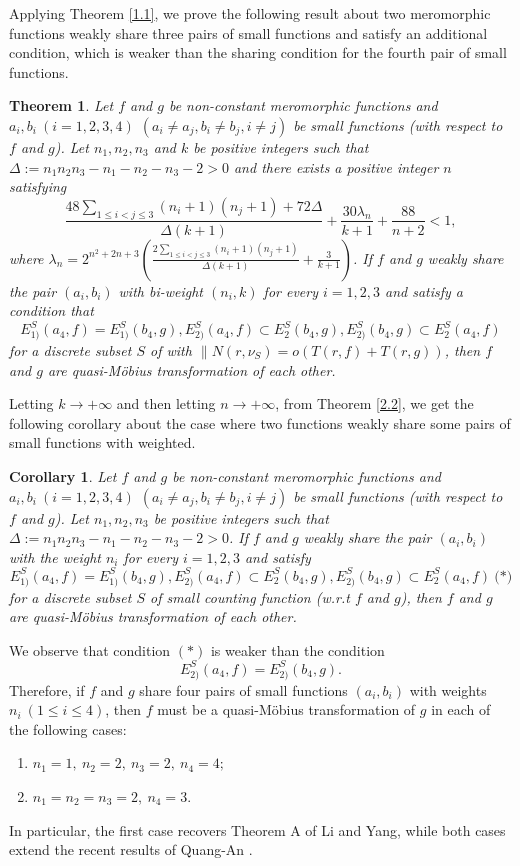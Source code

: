 \documentclass[12pt,leqno]{amsart}
\newtheorem{corollary}[equation]{Corollary}
\newtheorem{theorem}[equation]{Theorem}
\numberwithin{equation}{section}
\begin{document}
Applying Theorem \ref{1.1}, we prove the following result about two meromorphic functions weakly share three pairs of small functions and satisfy an additional condition, which is weaker than the sharing condition for the fourth pair of small functions.
\begin{theorem}\label{1.2}
Let $f$ and $g$ be non-constant meromorphic functions and $a_i,b_i\ (i=1,2,3,4)$ $ (a_i\ne a_j, b_i\ne b_j, i\ne j)$ be small functions (with respect to $f$ and $g$).  Let $n_1,n_2,n_3$ and $k$ be positive integers such that $\Delta:=n_1n_2n_3-n_1-n_2-n_3-2>0$ and there exists a positive integer $n$ satisfying
$$\frac{48\sum_{1\le i<j\le 3}(n_i+1)(n_j+1)+72\Delta}{\Delta(k+1)}+\frac{30\lambda_n}{k+1}+\frac{88}{n+2}<1,$$
where $\lambda_n=2^{n^2+2n+3}\left(\frac{2\sum_{1\le i<j\le 3}(n_i+1)(n_j+1)}{\Delta(k+1)}+\frac{3}{k+1}\right)$.
If $f$ and $g$ weakly share the pair $(a_i,b_i)$ with bi-weight $(n_i,k)$ for every $i=1,2,3$ and satisfy a condition that
$$E^S_{1)}(a_4,f)=E^S_{1)}(b_4,g),E^S_{2)}(a_4,f)\subset E^S_{2}(b_4,g),E^S_{2)}(b_4,g)\subset E^S_{2}(a_4,f)$$
for a discrete subset $S$ of with $\| N(r,\nu_S)=o(T(r,f)+T(r,g))$, then $f$ and $g$ are quasi-M\"{o}bius transformation of each other.
\end{theorem}

Letting $k\longrightarrow +\infty$ and then letting $n\longrightarrow +\infty$, from Theorem \ref{2.2}, we get the following corollary about the case where two functions weakly share some pairs of small functions with weighted.
\begin{corollary}\label{1.3}
Let $f$ and $g$ be non-constant meromorphic functions and $a_i,b_i\ (i=1,2,3,4)$ $ (a_i\ne a_j, b_i\ne b_j, i\ne j)$ be small functions (with respect to $f$ and $g$).  Let $n_1,n_2,n_3$ be positive integers such that $\Delta:=n_1n_2n_3-n_1-n_2-n_3-2>0$.
If $f$ and $g$ weakly share the pair $(a_i,b_i)$ with the weight $n_i$ for every $i=1,2,3$ and satisfy
$$E^S_{1)}(a_4,f)=E^S_{1)}(b_4,g),E^S_{2)}(a_4,f)\subset E^S_{2}(b_4,g),E^S_{2)}(b_4,g)\subset E^S_{2}(a_4,f)\ \text{(*)}$$
for a discrete subset $S$ of small counting function (w.r.t $f$ and $g$), then $f$ and $g$ are quasi-M\"{o}bius transformation of each other.
\end{corollary}
We observe that condition $(*)$ is weaker than the condition
$$E^S_{2)}(a_4,f)=E^S_{2)}(b_4,g).$$
Therefore, if $f$ and $g$ share four pairs of small functions $(a_i,b_i)$ with weights $n_i\ (1\le i\le 4)$, then $f$ must be a quasi-M\"obius transformation of $g$ in each of the following cases:
\begin{enumerate}
\item $n_1=1,\ n_2=2,\ n_3=2,\ n_4=4;$
\item $n_1=n_2=n_3=2,\ n_4=3.$
\end{enumerate}
In particular, the first case recovers Theorem A of Li and Yang, while both cases extend the recent results of Quang-An \cite[Theorem 1.2 and Theorem 1.3]{QA}.
\end{document}
